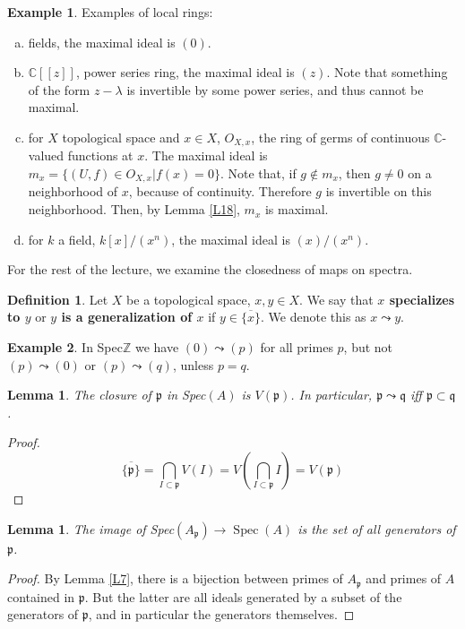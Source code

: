 \documentclass{article}
\newcommand{\Z}{\mathbb{Z}}
\newcommand{\C}{\mathbb{C}}
\newcommand{\fr}{\mathfrak}
\DeclareMathOperator{\Spec}{Spec}
\theoremstyle{plain}
\newtheorem{lem}[thm]{Lemma}
\theoremstyle{definition}
\newtheorem{defn}{Definition}
\newtheorem{exmp}{Example}
\theoremstyle{remark}
\begin{document}
\begin{exmp}
\label{E4}
Examples of local rings:
\begin{enumerate} [(a)]
\item fields, the maximal ideal is $(0)$.
\item $\C[[z]]$, power series ring, the maximal ideal is $(z)$. Note that something of the form $z-\lambda$ is invertible by some power series, and thus cannot be maximal.
\item for $X$ topological space and $x\in X$, $O_{X,x}$, the ring of germs of continuous $\C$-valued functions at $x$. The maximal ideal is $m_x = \{(U,f)\in O_{X,x} | f(x) = 0 \}$. Note that, if $g\not \in m_x$, then $g\neq 0$ on a neighborhood of $x$, because of continuity. Therefore $g$ is invertible on this neighborhood. Then, by Lemma \ref{L18}, $m_x$ is maximal.
\item for $k$ a field, $k[x]/(x^n)$, the maximal ideal is $(x)/(x^n)$.
\end{enumerate}
\end{exmp}

For the rest of the lecture, we examine the closedness of maps on spectra.
\begin{defn}
Let $X$ be a topological space, $x,y\in X$. We say that \textbf{$x$ specializes to $y$} or \textbf{$y$ is a generalization of $x$} if $y\in \overline{\{x\}}$. We denote this as $x\leadsto y$.
\end{defn}

\begin{exmp}
\label{E5}
In Spec$\Z$ we have $(0) \leadsto (p)$ for all primes $p$, but not $(p) \leadsto (0)$ or $(p) \leadsto (q)$, unless $p = q$.
\end{exmp}

\begin{lem}
\label{L20}
The closure of $\fr p$ in Spec$(A)$ is $V(\fr p)$. In particular, $\fr p \leadsto \fr q$ iff $\fr p \subset \fr q$.
\end{lem}
\begin{proof}
\[       \overline{\{\fr p\}} = \bigcap_{I\subset \fr p} V(I) = V(\bigcap_{I \subset \fr p} I) = V(\fr p)      \]
\end{proof}

\begin{lem}
\label{L21}
The image of Spec$(A_{\fr p}) \to \Spec(A)$ is the set of all generators of $\fr p$.
\end{lem}
\begin{proof}
By Lemma \ref{L7}, there is a bijection between primes of $A_{\fr p}$ and primes of $A$ contained in $\fr p$. But the latter are all ideals generated by a subset of the generators of $\fr p$, and in particular the generators themselves.
\end{proof}
\end{document}
